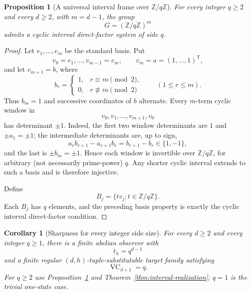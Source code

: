 \documentclass[11pt]{article}
\newtheorem{proposition}[theorem]{Proposition}
\newtheorem{corollary}[theorem]{Corollary}
\newcommand{\VC}{\operatorname{VC}}
\begin{document}
\begin{proposition}[A universal interval frame over \(\mathbb Z/q\mathbb Z\)]
\label{prop:universal-interval-frame}
For every integer \(q\ge2\) and every \(d\ge2\), with \(m=d-1\),
the group
\[
 G=(\mathbb Z/q\mathbb Z)^m
\]
admits a cyclic interval direct-factor system of side \(q\).
\end{proposition}

\begin{proof}
Let \(e_1,\ldots,e_m\) be the standard basis. Put
\[
 v_0=e_1,\ldots,v_{m-1}=e_m,\qquad
 v_m=a=(1,\ldots,1)^{\mathsf T},
\]
and let \(v_{m+1}=b\), where
\[
 b_r=\begin{cases}
 1,& r\equiv m\pmod2,\\
 0,& r\not\equiv m\pmod2
 \end{cases}
 \qquad(1\le r\le m).
\]
Thus \(b_m=1\) and successive coordinates of \(b\) alternate.
Every \(m\)-term cyclic window in
\[
 v_0,v_1,\ldots,v_{m+1},v_0
\]
has determinant \(\pm1\). Indeed, the first two window determinants are
\(1\) and \(\pm a_1=\pm1\); the intermediate determinants are, up to
sign,
\[
 a_r b_{r+1}-a_{r+1}b_r=b_{r+1}-b_r\in\{1,-1\},
\]
and the last is \(\pm b_m=\pm1\). Hence each window is invertible over
\(\mathbb Z/q\mathbb Z\), for arbitrary (not necessarily prime-power)
\(q\). Any shorter cyclic interval extends to such a basis and is therefore
injective.

Define
\[
 B_j=\{t v_j:t\in\mathbb Z/q\mathbb Z\}.
\]
Each \(B_j\) has \(q\) elements, and the preceding basis property is
exactly the cyclic interval direct-factor condition.
\end{proof}

\begin{corollary}[Sharpness for every integer side size]
\label{cor:all-q-sharp}
For every \(d\ge2\) and every integer \(q\ge1\), there is a finite
abelian observer with
\[
 t_h=q^{d-1}
\]
and a finite regular \((d,h)\)-tuple-substitutable target family satisfying
\[
 \VC_{d+1}=q.
\]
For \(q\ge2\) use Proposition~\ref{prop:universal-interval-frame} and
Theorem~\ref{thm:interval-realization}; \(q=1\) is the trivial
one-state case.
\end{corollary}
\end{document}
